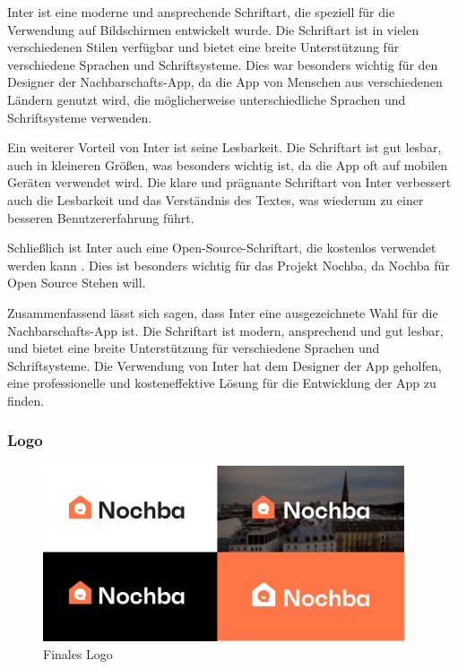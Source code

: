 Inter ist eine moderne und ansprechende Schriftart, die speziell für die Verwendung auf Bildschirmen entwickelt wurde. Die Schriftart ist in vielen verschiedenen Stilen verfügbar und bietet eine breite Unterstützung für verschiedene Sprachen und Schriftsysteme. Dies war besonders wichtig für den Designer der Nachbarschafts-App, da die App von Menschen aus verschiedenen Ländern genutzt wird, die möglicherweise unterschiedliche Sprachen und Schriftsysteme verwenden.

Ein weiterer Vorteil von Inter ist seine Lesbarkeit. Die Schriftart ist gut lesbar, auch in kleineren Größen, was besonders wichtig ist, da die App oft auf mobilen Geräten verwendet wird. Die klare und prägnante Schriftart von Inter verbessert auch die Lesbarkeit und das Verständnis des Textes, was wiederum zu einer besseren Benutzererfahrung führt.

Schließlich ist Inter auch eine Open-Source-Schriftart, die kostenlos verwendet werden kann \cite{inter-font}. Dies ist besonders wichtig für das Projekt Nochba, da Nochba für Open Source Stehen will.

Zusammenfassend lässt sich sagen, dass Inter eine ausgezeichnete Wahl für die Nachbarschafts-App ist. Die Schriftart ist modern, ansprechend und gut lesbar, und bietet eine breite Unterstützung für verschiedene Sprachen und Schriftsysteme. Die Verwendung von Inter hat dem Designer der App geholfen, eine professionelle und kosteneffektive Lösung für die Entwicklung der App zu finden.
\subsubsection{Logo}

\begin{figure}[H]
  \centering
  \includegraphics[width=0.95\textwidth]{pics/final-logo.png}
  \caption{Finales Logo}
  \label{fig:final-logo}
\end{figure}


